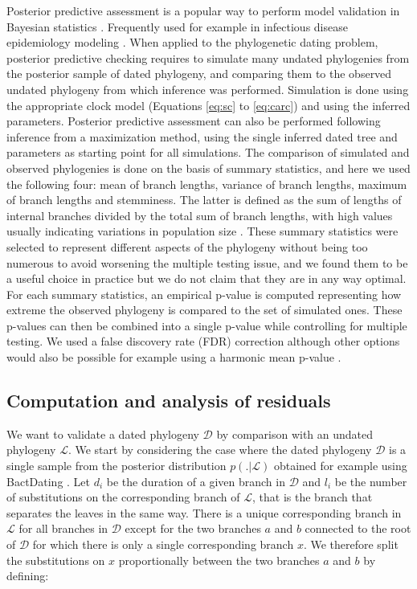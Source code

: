 \documentclass{article}
\begin{document}
Posterior predictive assessment is a popular way to perform
model validation in Bayesian statistics \citep{Meng1994,Gelman1996}.
Frequently used for example in infectious disease epidemiology modeling \citep{Didelot2017b,Whittles2017,gibsonComparisonAssessmentEpidemic2018}.
When applied to the phylogenetic dating problem, posterior predictive checking requires
to simulate many undated phylogenies from the posterior sample of dated phylogeny,
and comparing them to the observed undated phylogeny from which inference was performed.
Simulation is done using the appropriate clock model (Equations \ref{eq:sc} to \ref{eq:carc})
and using the inferred parameters. Posterior predictive assessment can also be performed
following inference from a maximization method, using the single inferred dated tree and parameters as 
starting point for all simulations. 
The comparison of simulated and observed phylogenies is done on the basis of summary statistics, and
here we used the following four: mean of branch lengths, variance of branch lengths,
maximum of branch lengths and stemminess. The latter is defined as the sum of lengths of 
internal branches divided by the total sum of branch lengths, with high values usually indicating
variations in population size \citep{fialaFactorsDeterminingAccuracy1985,Didelot2009d}.
These summary statistics were selected to represent different aspects of the phylogeny without
being too numerous to avoid worsening the multiple testing issue, and we found them to be a useful
choice in practice but we do not claim that they are in any way optimal.
For each summary statistics, an empirical p-value is computed representing how extreme the 
observed phylogeny is compared to the set of simulated ones. 
These p-values can then be combined into a single p-value while controlling for multiple testing.
We used a false discovery rate (FDR) correction \citep{Benjamini1995} although other options would also be 
possible for example using a harmonic mean p-value \citep{wilsonHarmonicMeanPvalue2019}.

\subsection*{Computation and analysis of residuals}

We want to validate a dated phylogeny $\mathcal{D}$ by comparison with an undated phylogeny $\mathcal{L}$. We start by considering the case where the dated phylogeny $\mathcal{D}$ is a single sample from the posterior distribution $p(.|\mathcal{L})$ obtained for example using BactDating \citep{Didelot2018}.
Let $d_i$ be the duration of a given branch in $\mathcal{D}$ and $l_i$ be the number of substitutions on the corresponding branch of $\mathcal{L}$, that is the branch that separates the leaves in the same way. There is a unique corresponding branch in $\mathcal{L}$ for all branches in $\mathcal{D}$ except for the two branches $a$ and $b$ connected to the root of $\mathcal{D}$ for which there is only a single corresponding branch $x$. We therefore split the substitutions on $x$ proportionally between the two branches $a$ and $b$ by defining:
\end{document}
